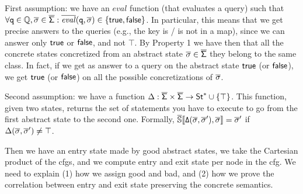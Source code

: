 First assumption: we have an $eval$ function (that evaluates a query) such that $\forall \mathtt{q} \in \mathbb{Q}, \mathsf{\overline{\sigma}} \in \mathsf{\overline{\Sigma}} : \overline{\mathit{eval}}(\mathtt{q}, \mathsf{\overline{\sigma}}) \in \{\mathsf{true}, \mathsf{false}\}$. In particular, this means that we get precise answers to the queries (e.g., the key is / is not in a map), since we can answer only $\mathsf{true}$ or $\mathsf{false}$, and not $\top$. By Property 1 we have then that all the concrete states concretized from an abstract state $\mathsf{\overline{\sigma}} \in \mathsf{\overline{\Sigma}}$ they belong to the same class. In fact, if we get as answer to a query on the abstract state $\mathsf{true}$ (or $\mathsf{false}$), we get $\mathsf{true}$ (or $\mathsf{false}$) on all the possible concretizations of $\mathsf{\overline{\sigma}}$. 

Second assumption: we have a function $\Delta : \mathsf{\overline{\Sigma}} \times \mathsf{\overline{\Sigma}} \rightarrow\mathsf{St}^*\cup \{\top\}$. This function, given two states, returns the set of statements you have to execute to go from the first abstract state to the second one. Formally, $\mathbb{\overline{\mathit{\mathbb{S}}}}\llbracket \mathtt{\Delta(\mathsf{\overline{\sigma}}, \mathsf{\overline{\sigma}}'),\mathsf{\overline{\sigma}}} \rrbracket=\mathsf{\overline{\sigma}}'$ if $\Delta(\mathsf{\overline{\sigma}}, \mathsf{\overline{\sigma}}') \neq \top$.

Then we have an entry state made by good abstract states, we take the Cartesian product of the cfgs, and we compute entry and exit state per node in the cfg. We need to explain (1) how we assign good and bad, and (2) how we prove the correlation between entry and exit state preserving the concrete semantics.
